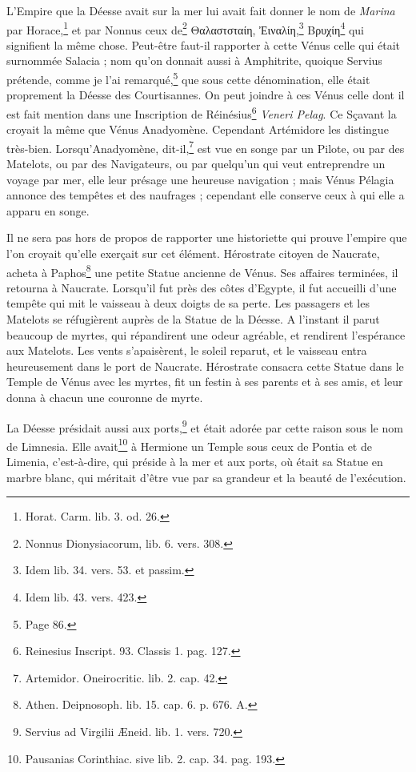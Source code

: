 \documentclass[a4paper, 11pt, oneside, polutonikogreek, french]{article}
\begin{document}
L'Empire que la Déesse avait sur la mer lui avait fait donner le nom de \emph{Marina} par Horace,\footnote{Horat. Carm. lib. 3. od. 26.} et par Nonnus ceux de\footnote{Nonnus Dionysiacorum, lib. 6. vers. 308.} Θαλαστσταίη, Ἐιναλίη,\footnote{Idem lib. 34. vers. 53. et passim.} Βρυχίη\footnote{Idem lib. 43. vers. 423.} qui signifient la même chose. Peut-être faut-il rapporter à cette Vénus celle qui était surnommée Salacia ; nom qu'on donnait aussi à Amphitrite, quoique Servius prétende, comme je l'ai remarqué,\footnote{Page 86.} que sous cette dénomination, elle était proprement la Déesse des Courtisannes. On peut joindre à ces Vénus celle dont il est fait mention dans une Inscription de Réinésius\footnote{Reinesius Inscript. 93. Classis 1. pag. 127.} \emph{Veneri Pelag}. Ce Sçavant la croyait la même que Vénus Anadyomène. Cependant Artémidore les distingue très-bien. Lorsqu'Anadyomène, dit-il,\footnote{Artemidor. Oneirocritic. lib. 2. cap. 42.} est vue en songe par un Pilote, ou par des Matelots, ou par des Navigateurs, ou par quelqu'un qui veut entreprendre un voyage par mer, elle leur présage une heureuse navigation ; mais Vénus Pélagia annonce des tempêtes et des naufrages ; cependant elle conserve ceux à qui elle a apparu en songe.

Il ne sera pas hors de propos de rapporter une historiette qui prouve l'empire que l'on croyait qu'elle exerçait sur cet élément. Hérostrate citoyen de Naucrate, acheta à Paphos\footnote{Athen. Deipnosoph. lib. 15. cap. 6. p. 676. A.} une petite Statue ancienne de Vénus. Ses affaires terminées, il retourna à Naucrate. Lorsqu'il fut près des côtes d'Egypte, il fut accueilli d'une tempête qui mit le vaisseau à deux doigts de sa perte. Les passagers et les Matelots se réfugièrent auprès de la Statue de la Déesse. A l'instant il parut beaucoup de myrtes, qui répandirent une odeur agréable, et rendirent l'espérance aux Matelots. Les vents s'apaisèrent, le soleil reparut, et le vaisseau entra heureusement dans le port de Naucrate. Hérostrate consacra cette Statue dans le Temple de Vénus avec les myrtes, fit un festin à ses parents et à ses amis, et leur donna à chacun une couronne de myrte.

La Déesse présidait aussi aux ports,\footnote{Servius ad Virgilii Æneid. lib. 1. vers. 720.} et était adorée par cette raison sous le nom de Limnesia. Elle avait\footnote{Pausanias Corinthiac. sive lib. 2. cap. 34. pag. 193.} à Hermione un Temple sous ceux de Pontia et de Limenia, c'est-à-dire, qui préside à la mer et aux ports, où était sa Statue en marbre blanc, qui méritait d'être vue par sa grandeur et la beauté de l'exécution.
\end{document}
